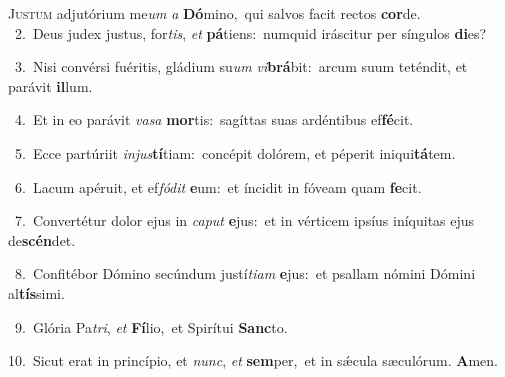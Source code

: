\lettrine{\initial\textcolor{\initialcolor}{J}}{ustum} adjutórium me\textit{um} \textit{a} \textbf{Dó}\-mino,~\star qui salvos facit rectos \textbf{cor}\-de.\\
{\numbfont\textcolor{\numbcolor}{~2.}}~Deus judex justus, for\-\textit{tis}\-, \textit{et} \textbf{pá}\-tiens:~\star numquid iráscitur per síngulos \textbf{di}\-es?\par
{\numbfont\textcolor{\numbcolor}{~3.}}~Nisi convérsi fuéritis, gládium su\textit{um} \textit{vi}\-\textbf{brá}bit:~\star arcum suum teténdit, et parávit \textbf{il}\-lum.\par
{\numbfont\textcolor{\numbcolor}{~4.}}~Et in eo parávit \textit{va}\-\textit{sa} \textbf{mor}\-tis:~\star sagíttas suas ardéntibus ef\-\textbf{fé}\-cit.\par
{\numbfont\textcolor{\numbcolor}{~5.}}~Ecce partúriit \textit{in}\-\textit{jus}\textbf{tí}tiam:~\star concépit dolórem, et péperit iniqui\-\textbf{tá}\-tem.\par
{\numbfont\textcolor{\numbcolor}{~6.}}~Lacum apéruit, et ef\-\textit{fó}\-\textit{dit} \textbf{e}\-um:~\star et íncidit in fóveam quam \textbf{fe}\-cit.\par
{\numbfont\textcolor{\numbcolor}{~7.}}~Convertétur dolor ejus in \textit{ca}\-\textit{put} \textbf{e}\-jus:~\star et in vérticem ipsíus iníquitas ejus de\-\textbf{scén}\-det.\par
{\numbfont\textcolor{\numbcolor}{~8.}}~Confitébor Dómino secúndum justí\-\textit{ti}\-\textit{am} \textbf{e}\-jus:~\star et psallam nómini Dómini al\-\textbf{tís}\-simi.\par
{\numbfont\textcolor{\numbcolor}{~9.}}~Glória Pa\-\textit{tri}\-, \textit{et} \textbf{Fí}\-lio,~\star et Spirítui \textbf{Sanc}\-to.\par
{\numbfont\textcolor{\numbcolor}{10.}}~Sicut erat in princípio, et \textit{nunc}\-, \textit{et} \textbf{sem}\-per,~\star et in sǽcula sæculórum. \textbf{A}\-men.\par
